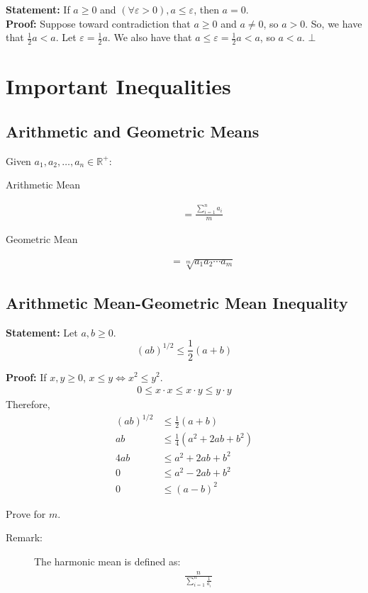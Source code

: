 \documentclass[10pt]{extarticle}
\newcommand{\R}{\mathbb{R}}
\begin{document}
    \textbf{Statement:} If $a\geq 0$ and $(\forall \varepsilon > 0), a\leq \varepsilon$, then $a=0$.\\

    \textbf{Proof:} Suppose toward contradiction that $a\geq 0$ and $a\neq 0$, so $a > 0$. So, we have that $\frac{1}{2}a < a$. Let $\varepsilon = \frac{1}{2}a$. We also have that $a \leq \varepsilon = \frac{1}{2}a < a$, so $a<a$. $\bot$
  \section{Important Inequalities}%
  \subsection{Arithmetic and Geometric Means}%
    Given $a_1,a_2,\dots,a_n\in \R^+$:
    \begin{description}
      \item[Arithmetic Mean]
    \begin{align*}
      &= \frac{\sum_{i =1}^{n} a_i}{m}
    \end{align*}
    \end{description}
    \begin{description}
      \item[Geometric Mean]
    \begin{align*}
      &= \sqrt[m]{a_1a_2\cdots a_m}
    \end{align*}
    \end{description}
    \subsection{Arithmetic Mean-Geometric Mean Inequality}%
    \textbf{Statement:} Let $a,b \geq 0$.
      \[
        (ab)^{1/2} \leq \frac{1}{2}(a+b)
      \] 

      \textbf{Proof:} If $x,y \geq 0$, $x\leq y \Leftrightarrow x^2 \leq y^2$.
      \begin{align*}
          0 \leq x\cdot x \leq x \cdot y \leq y\cdot y\tag*{by property (ii) of ordered fields}
      \end{align*}
      Therefore,  
      \begin{align*}
        (ab)^{1/2}&\leq \frac{1}{2}(a+b)\\
        ab &\leq \frac{1}{4}(a^2 + 2ab + b^2)\\
        4ab &\leq a^2 + 2ab + b^2 \\
        0 &\leq a^2 - 2ab + b^2\\
        0 &\leq (a-b)^2 \tag*{by definition}
      \end{align*}
      \begin{description}
        \small
        \item[Challenge:] Prove for $m$.
      \end{description}
    \begin{description}
      \item[Remark:] The harmonic mean is defined as:
    \begin{align*}
      \frac{n}{\displaystyle\sum_{i=1}^{n}\frac{1}{a_i}}
    \end{align*}
    \end{description}
\end{document}

